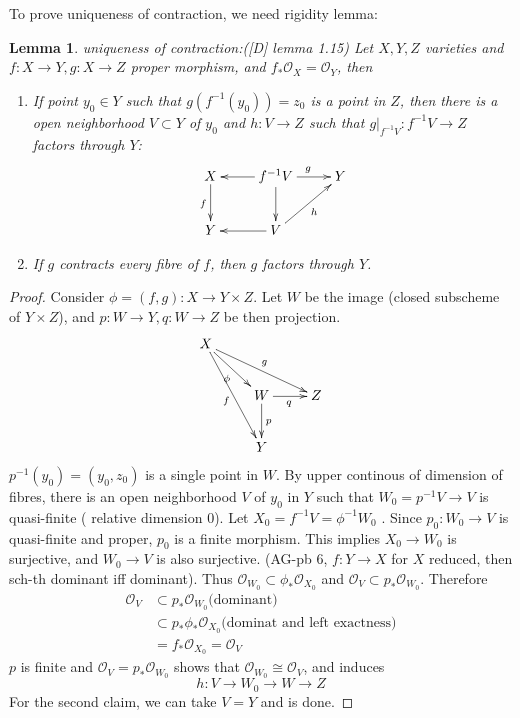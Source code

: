 \documentclass{article}
\newtheorem{lem}[defn]{Lemma}
\begin{document}
To prove uniqueness of contraction, we need rigidity lemma:
\begin{lem}
  uniqueness of contraction:([D] lemma 1.15) Let $ X,Y,Z $ varieties and $ f:X\to Y,g:X\to Z $ proper morphism, and $ f_*\mathcal{O}_X=\mathcal{O}_Y $, then
  \begin{enumerate}
    \item If point $ y_0\in Y $ such that $ g(f^{-1}(y_0))=z_0 $ is a point in $ Z $, then there is a open neighborhood $ V\subset Y $ of $ y_0 $  and $ h:V\to Z $ such that $ g|_{f^{-1}V}:f^{-1}V\to Z $ factors through $ Y $:
      \[
        \xymatrix{
          X\ar[d]_{f}&f^{-1}V\ar[l]\ar[d]\ar[r]^{g}&Y\\
          Y&V\ar[l]\ar[ur]_{h}
        }
      \]
    \item If $ g $ contracts every fibre of $ f $, then $ g $ factors through $ Y $.
  \end{enumerate}
\end{lem}
\begin{proof}
  Consider $ \phi=(f,g):X\to Y\times Z $. Let  $ W $ be the image (closed subscheme of $ Y\times Z $), and  $ p:W\to Y,q:W\to Z $ be then projection.
  \[ \xymatrix{
    X\ar[rrd]^g\ar[ddr]_f\ar[rd]_{\phi}\\
    &W\ar[d]^p\ar[r]_q&Z\\
    &Y
    } \]
  $ p^{-1}(y_0)=(y_0,z_0)  $ is a single point in $ W $. By upper continous of dimension of fibres, there is an open neighborhood $ V $ of $ y_0 $ in $ Y $ such that $ W_0=p^{-1}V\to V $ is quasi-finite ( relative dimension 0). Let $ X_0=f^{-1}V=\phi^{-1}W_0 $ . Since  $ p_0:W_0\to V $ is quasi-finite and proper, $ p_0 $ is a finite morphism. This implies $ X_0\to W_0 $ is surjective, and $ W_0\to V $ is also surjective. (AG-pb 6, $ f:Y\to X $ for $ X $ reduced, then sch-th dominant iff dominant). Thus $ \mathcal{O}_{W_0}\subset \phi_*\mathcal{O}_{X_0} $ and $ \mathcal{O}_V\subset p_*\mathcal{O}_{W_0}  $. Therefore
  \begin{equation*}
  \begin{aligned}
  \mathcal{O}_{V}&\subset p_*\mathcal{O}_{W_0} \text{(dominant)}\\
  &\subset p_*\phi_* \mathcal{O}_{X_0} \text{(dominat and left exactness)}\\
  &=f_*\mathcal{O}_{X_0}=\mathcal{O}_V
  \end{aligned}
  \end{equation*}
  $ p $ is finite and $ \mathcal{O}_{V}= p_*\mathcal{O}_{W_0} $ shows that $ \mathcal{O}_{W_0}\cong \mathcal{O}_V $, and induces \[ h:V\to W_0\to W\to Z \]
  For the second claim, we can take $ V=Y $ and is done.
\end{proof}
\end{document}

